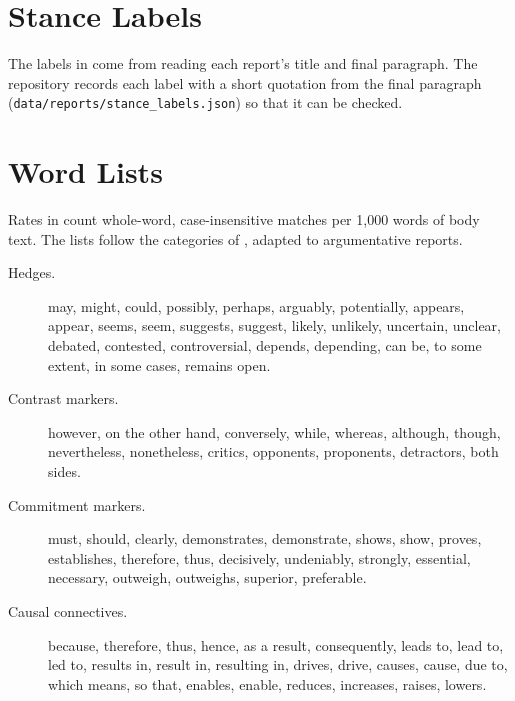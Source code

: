 \section{Stance Labels}
\label{app:stance}
The labels in  come from reading each \sys{} report's title and final paragraph. The repository records each label with a short quotation from the final paragraph (\texttt{data/reports/stance\_labels.json}) so that it can be checked.

\section{Word Lists}
\label{app:lexicon}
Rates in  count whole-word, case-insensitive matches per 1{,}000 words of body text. The lists follow the categories of \citet{hyland2005metadiscourse}, adapted to argumentative reports.
\begin{description}
\item[Hedges.] may, might, could, possibly, perhaps, arguably, potentially, appears, appear, seems, seem, suggests, suggest, likely, unlikely, uncertain, unclear, debated, contested, controversial, depends, depending, can be, to some extent, in some cases, remains open.
\item[Contrast markers.] however, on the other hand, conversely, while, whereas, although, though, nevertheless, nonetheless, critics, opponents, proponents, detractors, both sides.
\item[Commitment markers.] must, should, clearly, demonstrates, demonstrate, shows, show, proves, establishes, therefore, thus, decisively, undeniably, strongly, essential, necessary, outweigh, outweighs, superior, preferable.
\item[Causal connectives.] because, therefore, thus, hence, as a result, consequently, leads to, lead to, led to, results in, result in, resulting in, drives, drive, causes, cause, due to, which means, so that, enables, enable, reduces, increases, raises, lowers.
\end{description}
